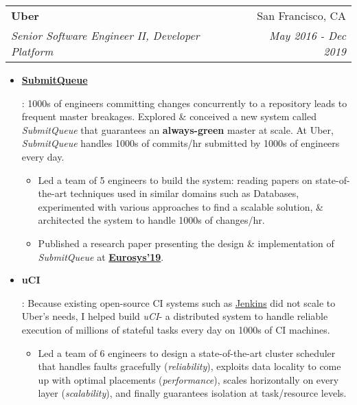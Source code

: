 \documentclass[letterpaper,11pt]{article}
\makeatletter
\newcommand{\resumeItem}[2]{
  \item\small{
    \textbf{#1}{: #2 \vspace{-2pt}}
  }
}
\newcommand{\resumeSubheading}[4]{
  \vspace{-1pt}\item
    \begin{tabular*}{0.97\textwidth}[t]{l@{\extracolsep{\fill}}r}
      \textbf{#1} & #2 \\
      \textit{\small#3} & \textit{\small #4} \\
    \end{tabular*}\vspace{-5pt}
}
\newcommand{\resumeItemListStart}{\begin{itemize}}
\newcommand{\resumeItemListEnd}{\end{itemize}}
\newcommand{\sq}{\textit{SubmitQueue}\xspace}
\newcommand{\uci}{\textit{uCI}\xspace}
\makeatother
\begin{document}

\resumeSubheading
{Uber}{San Francisco, CA}
{Senior Software Engineer II, Developer Platform}{May 2016 - Dec 2019}
\resumeItemListStart
\resumeItem{\href{https://vimeo.com/358691692}{SubmitQueue}}
{
  1000s of engineers committing changes concurrently to a repository leads to frequent master breakages.
  Explored \& conceived a new system called \sq that guarantees an \textbf{always-green} master at scale. At Uber, \sq handles 1000s of commits/hr submitted by 1000s of engineers every day.
  \begin{itemize}[label=\textbf{--}]
    \item
          Led a team of 5 engineers to build the system: reading papers on state-of-the-art techniques used in similar domains such as Databases, experimented with various approaches to find a scalable solution, \& architected the system to handle 1000s of changes/hr.
    \item
          Published a research paper presenting the design \& implementation of \sq at \href{https://doi.org/10.1145/3302424.3303970}{\textbf{Eurosys'19}}.
  \end{itemize}
}
\resumeItem{uCI}
{
  Because existing open-source CI systems such as \href{https://jenkins.io/}{Jenkins} did not scale to Uber's needs, I helped build \uci - a distributed system to handle reliable execution of millions of stateful tasks every day on 1000s of CI machines.
  \begin{itemize}[label=\textbf{--}]
    \item
          Led a team of 6 engineers to design a state-of-the-art cluster scheduler that handles faults gracefully (\textit{reliability}), exploits data locality to come up with optimal placements (\textit{performance}), scales horizontally on every layer (\textit{scalability}), and finally guarantees isolation at task/resource levels.
  \end{itemize}
}
\resumeItemListEnd
\end{document}
